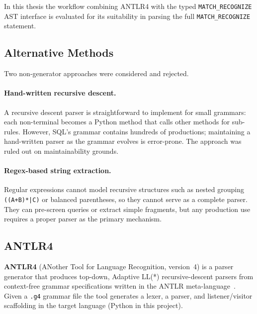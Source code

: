 In this thesis the workflow combining ANTLR4 with the typed
\texttt{MATCH\_RECOGNIZE} AST interface is evaluated for its
suitability in parsing the full \texttt{MATCH\_RECOGNIZE} statement.

\subsection{Alternative Methods}
\label{subsec:meth-alternatives}

Two non-generator approaches were considered and rejected.

\paragraph{Hand-written recursive descent.}
A recursive descent parser is straightforward to implement for
small grammars: each non-terminal becomes a Python method that
calls other methods for sub-rules.  However, SQL's grammar contains
hundreds of productions; maintaining a hand-written parser as the
grammar evolves is error-prone.  The approach was ruled out on
maintainability grounds.

\paragraph{Regex-based string extraction.}
Regular expressions cannot model recursive structures such as nested
grouping \texttt{((A+B)*|C)} or balanced parentheses, so they
cannot serve as a complete parser.  They can pre-screen queries or
extract simple fragments, but any production use requires a proper
parser as the primary mechanism.

\subsection{ANTLR4}
\label{subsec:meth-antlr4}

\textbf{ANTLR4} (ANother Tool for Language Recognition, version~4)
is a parser generator that produces top-down, Adaptive LL(*)
recursive-descent parsers from context-free grammar specifications
written in the ANTLR meta-language~\cite{Parr2013,parr2014adaptive,antlr_website,parr_antlr_docs}.  Given a \texttt{.g4} grammar
file the tool generates a lexer, a parser, and listener/visitor
scaffolding in the target language (Python in this project).

